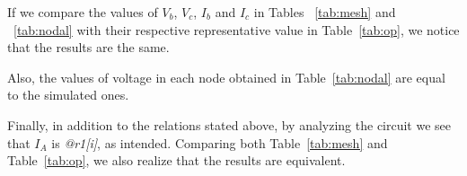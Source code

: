 If we compare the values of $V_b$, $V_c$, $I_b$ and $I_c$ in Tables ~\ref{tab:mesh} and ~\ref{tab:nodal} with their respective representative value in Table~\ref{tab:op}, we notice that the results are the same. 

Also, the values of voltage in each node obtained in Table~\ref{tab:nodal} are equal to the simulated ones.

Finally, in addition to the relations stated above, by analyzing the circuit we see that $I_A$ is \textit{@r1[i]}, as intended. Comparing both Table~\ref{tab:mesh} and Table~\ref{tab:op}, we also realize that the results are equivalent.







